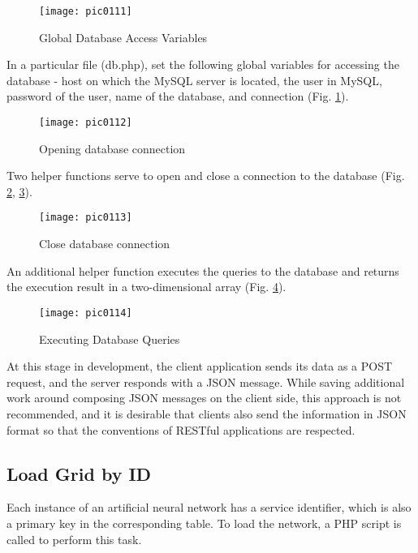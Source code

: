 \begin{figure}[h]
\centering
\texttt{[image: pic0111]}
\caption{Global Database Access Variables}
\label{fig:pic0111}
\end{figure}
\FloatBarrier

In a particular file (db.php), set the following global variables for accessing the database - host on which the MySQL server is located, the user in MySQL, password of the user, name of the database, and connection (Fig. \ref{fig:pic0111}).

\begin{figure}[h]
\centering
\texttt{[image: pic0112]}
\caption{Opening database connection}
\label{fig:pic0112}
\end{figure}
\FloatBarrier

Two helper functions serve to open and close a connection to the database (Fig. \ref{fig:pic0112}, \ref{fig:pic0113}).

\begin{figure}[h]
\centering
\texttt{[image: pic0113]}
\caption{Close database connection}
\label{fig:pic0113}
\end{figure}
\FloatBarrier

An additional helper function executes the queries to the database and returns the execution result in a two-dimensional array (Fig. \ref{fig:pic0114}).

\begin{figure}[h]
\centering
\texttt{[image: pic0114]}
\caption{Executing Database Queries}
\label{fig:pic0114}
\end{figure}
\FloatBarrier

At this stage in development, the client application sends its data as a POST request, and the server responds with a JSON message. While saving additional work around composing JSON messages on the client side, this approach is not recommended, and it is desirable that clients also send the information in JSON format so that the conventions of RESTful applications are respected.

\subsection{Load Grid by ID}

Each instance of an artificial neural network has a service identifier, which is also a primary key in the corresponding table. To load the network, a PHP script is called to perform this task.

